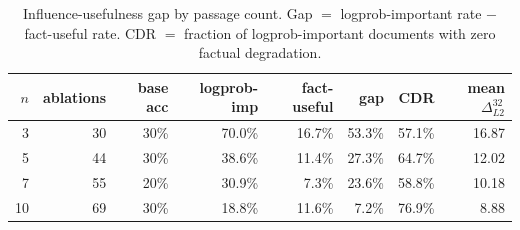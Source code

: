 \begin{table}[h]
\centering\small
\begin{tabular}{rrrrrrrr}
\toprule
$n$ & ablations & base acc & logprob-imp & fact-useful & gap & CDR & mean $\Delta_{L2}^{32}$ \\
\midrule
  3 & 30 & 30\% & 70.0\% & 16.7\% & 53.3\% & 57.1\% & 16.87 \\
  5 & 44 & 30\% & 38.6\% & 11.4\% & 27.3\% & 64.7\% & 12.02 \\
  7 & 55 & 20\% & 30.9\% & 7.3\% & 23.6\% & 58.8\% & 10.18 \\
  10 & 69 & 30\% & 18.8\% & 11.6\% & 7.2\% & 76.9\% & 8.88 \\
\bottomrule
\end{tabular}
\caption{Influence-usefulness gap by passage count. Gap $=$ logprob-important rate $-$ fact-useful rate. CDR $=$ fraction of logprob-important documents with zero factual degradation.}
\label{tab:e5_passage_gap}
\end{table}
